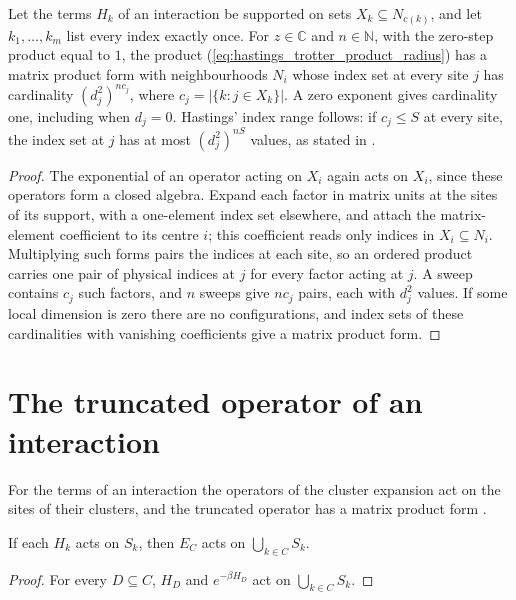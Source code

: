 \begin{lemma}
    \label{lem:hastings_active_index_product_form}
    \leanok
    Let the terms $H_k$ of an interaction be supported on sets $X_k\subseteq N_{c(k)}$, and
    let $k_1,\dots,k_m$ list every index exactly once. For $z\in\mathbb C$ and $n\in\mathbb N$,
    with the zero-step product equal to $1$, the product
    (\ref{eq:hastings_trotter_product_radius}) has a matrix product form with neighbourhoods
    $N_i$ whose index set at every site $j$ has cardinality $(d_j^2)^{nc_j}$, where
    $c_j=|\{k : j\in X_k\}|$. A zero exponent gives cardinality one, including when
    $d_j=0$. Hastings' index range follows: if $c_j\le S$ at every site, the index set at
    $j$ has at most $(d_j^2)^{nS}$ values, as stated in
    \cite[lines 1053--1075]{Hastings2006Solving}.
\end{lemma}
\begin{proof}\leanok
    The exponential of an operator acting on $X_i$ again acts on $X_i$,
    since these operators form a closed algebra. Expand each factor in
    matrix units at the sites of its support, with a one-element index set
    elsewhere, and attach the matrix-element coefficient to its centre
    $i$; this coefficient reads only indices in $X_i\subseteq N_i$.
    Multiplying such forms pairs the indices at each site, so an ordered
    product carries one pair of physical indices at $j$ for every factor
    acting at $j$. A sweep contains $c_j$ such factors, and $n$ sweeps give
    $nc_j$ pairs, each with $d_j^2$ values. If some local dimension is
    zero there are no configurations, and index sets of these cardinalities
    with vanishing coefficients give a matrix product form.
\end{proof}

\section{The truncated operator of an interaction}
\label{sec:cluster_expansion_interaction}

For the terms of an interaction the operators of the cluster expansion act on
the sites of their clusters, and the truncated operator has a matrix product
form \cite[lines 1256--1320]{Hastings2006Solving}.

\begin{lemma}
    \label{thm:hastings_cluster_operator_support}
    \leanok
    If each $H_k$ acts on $S_k$, then $E_C$ acts on $\bigcup_{k\in C}S_k$.
\end{lemma}
\begin{proof}
    \leanok
    For every $D\subseteq C$, $H_D$ and $e^{-\beta H_D}$ act on
    $\bigcup_{k\in C}S_k$.
\end{proof}

